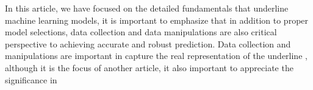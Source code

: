 
\par
In this article, we have focused on the detailed fundamentals that underline machine learning models, it is important to emphasize that in addition to proper model selections, data collection and data manipulations are also critical perspective to achieving accurate and robust prediction. Data collection and manipulations are important in capture the real representation of the underline , although it is the focus of another article, it also important to appreciate the significance in 
\par 
